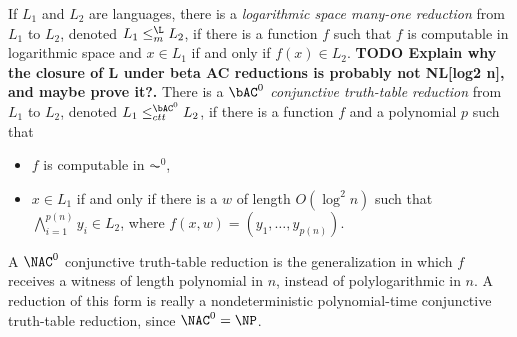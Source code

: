 \documentclass{article}
\newcommand{\todo}[1]{\textbf{TODO #1}}
\begin{document}
If $L_1$ and $L_2$ are languages, there is a \emph{logarithmic space many-one reduction} from $L_1$ to $L_2$, denoted $L_1 \leq_m^{\L} L_2$, if there is a function $f$ such that $f$ is computable in logarithmic space and $x \in L_1$ if and only if $f(x) \in L_2$.
\todo{Explain why the closure of L under beta AC reductions is probably not NL[log2 n], and maybe prove it?.}
There is a \emph{$\bAC^0$ conjunctive truth-table reduction} from $L_1$ to $L_2$, denoted $L_1 \leq^{\bAC^0}_{ctt} L_2$, if there is a function $f$ and a polynomial $p$ such that
\begin{itemize}
\item $f$ is computable in $\AC^0$,
\item $x \in L_1$ if and only if there is a $w$ of length $O(\log^2 n)$ such that $\bigwedge_{i = 1}^{p(n)} y_i \in L_2$, where $f(x, w) = (y_1, \dotsc, y_{p(n)})$.
\end{itemize}
A $\NAC^0$ conjunctive truth-table reduction is the generalization in which $f$ receives a witness of length polynomial in $n$, instead of polylogarithmic in $n$.
A reduction of this form is really a nondeterministic polynomial-time conjunctive truth-table reduction, since $\NAC^0 = \NP$.
\end{document}
